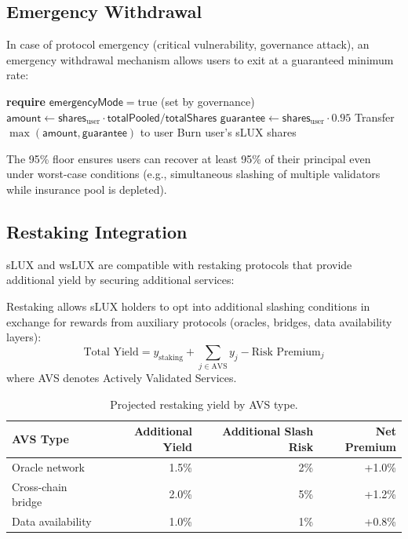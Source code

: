 \subsection{Emergency Withdrawal}

In case of protocol emergency (critical vulnerability, governance attack), an emergency withdrawal mechanism allows users to exit at a guaranteed minimum rate:

\begin{algorithm}[H]
\caption{Emergency Withdrawal}
\label{alg:emergency}
\begin{algorithmic}[1]
    \State \textbf{require} $\mathsf{emergencyMode} = \text{true}$ (set by governance)
    \State $\mathsf{amount} \gets \mathsf{shares}_{\text{user}} \cdot \mathsf{totalPooled} / \mathsf{totalShares}$
    \State $\mathsf{guarantee} \gets \mathsf{shares}_{\text{user}} \cdot 0.95$ 
    \State Transfer $\max(\mathsf{amount}, \mathsf{guarantee})$ to user
    \State Burn user's sLUX shares
\EndProcedure
\end{algorithmic}
\end{algorithm}

The 95\% floor ensures users can recover at least 95\% of their principal even under worst-case conditions (e.g., simultaneous slashing of multiple validators while insurance pool is depleted).

\subsection{Restaking Integration}

sLUX and wsLUX are compatible with restaking protocols that provide additional yield by securing additional services:

\begin{definition}[Restaking]
Restaking allows sLUX holders to opt into additional slashing conditions in exchange for rewards from auxiliary protocols (oracles, bridges, data availability layers):
\begin{equation}
    \text{Total Yield} = y_{\text{staking}} + \sum_{j \in \text{AVS}} y_j - \text{Risk Premium}_j
\end{equation}
where AVS denotes Actively Validated Services.
\end{definition}

\begin{table}[H]
\centering
\caption{Projected restaking yield by AVS type.}
\label{tab:restaking}
\begin{tabular}{lrrr}
\toprule
\textbf{AVS Type} & \textbf{Additional Yield} & \textbf{Additional Slash Risk} & \textbf{Net Premium} \\
\midrule
Oracle network & 1.5\% & 2\% & +1.0\% \\
Cross-chain bridge & 2.0\% & 5\% & +1.2\% \\
Data availability & 1.0\% & 1\% & +0.8\% \\
\bottomrule
\end{tabular}
\end{table}

